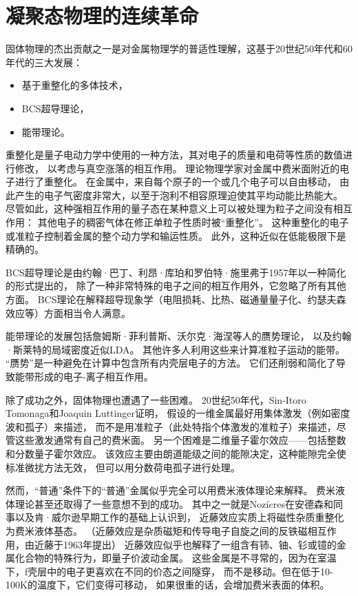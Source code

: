\documentclass{article}
\begin{document}
\pagestyle{fancy}
\lhead{}
\rhead{}
\section{凝聚态物理的连续革命}

固体物理的杰出贡献之一是对金属物理学的普适性理解，这基于20世纪50年代和60年代的三大发展：
\begin{itemize}
    \item 基于重整化的多体技术，
    \item BCS超导理论，
    \item 能带理论。
\end{itemize}

重整化是量子电动力学中使用的一种方法，其对电子的质量和电荷等性质的数值进行修改，
以考虑与真空涨落的相互作用。
理论物理学家对金属中费米面附近的电子进行了重整化。
在金属中，来自每个原子的一个或几个电子可以自由移动，
由此产生的电子气密度非常大，以至于泡利不相容原理迫使其平均动能比热能大。
尽管如此，这种强相互作用的量子态在某种意义上可以被处理为粒子之间没有相互作用：
其他电子的稠密气体在修正单粒子性质时被“重整化”。
这种重整化的电子或准粒子控制着金属的整个动力学和输运性质。
此外，这种近似在低能极限下是精确的。

BCS超导理论是由约翰·巴丁、利昂·库珀和罗伯特·施里弗于1957年以一种简化的形式提出的，
除了一种非常特殊的电子之间的相互作用外，它忽略了所有其他方面。
BCS理论在解释超导现象学（电阻损耗、比热、磁通量量子化、约瑟夫森效应等）方面相当令人满意。

能带理论的发展包括詹姆斯·菲利普斯、沃尔克·海涅等人的赝势理论，
以及约翰·斯莱特的局域密度近似LDA。
其他许多人利用这些来计算准粒子运动的能带。
“赝势”是一种避免在计算中包含所有内壳层电子的方法。
它们还削弱和简化了导致能带形成的电子-离子相互作用。 

除了成功之外，固体物理也遭遇了一些困难。
20世纪50年代，Sin-Itoro Tomonaga和Joaquin Luttinger证明，
假设的一维金属最好用集体激发（例如密度波和孤子）来描述，
而不是用准粒子（此处特指个体激发的准粒子）来描述，尽管这些激发通常有自己的费米面。
另一个困难是二维量子霍尔效应——包括整数和分数量子霍尔效应。
该效应主要由朗道能级之间的能隙决定，这种能隙完全使标准微扰方法无效，
但可以用分数荷电孤子进行处理。

然而，“普通”条件下的“普通”金属似乎完全可以用费米液体理论来解释。
费米液体理论甚至还取得了一些意想不到的成功。
其中之一就是Nozi$\grave{e}$res在安德森和同事以及肯·威尔逊早期工作的基础上认识到，
近藤效应实质上将磁性杂质重整化为费米液体基态。
（近藤效应是杂质磁矩和传导电子自旋之间的反铁磁相互作用，由近藤于1963年提出）
近藤效应似乎也解释了一组含有铈、铀、钐或镱的金属化合物的特殊行为，即量子价波动金属。
这些金属是不寻常的，因为在室温下，f壳层中的电子更喜欢在不同的价态之间隧穿，
而不是移动。但在低于10-100K的温度下，它们变得可移动，
如果很重的话，会增加费米表面的体积。
\end{document}
